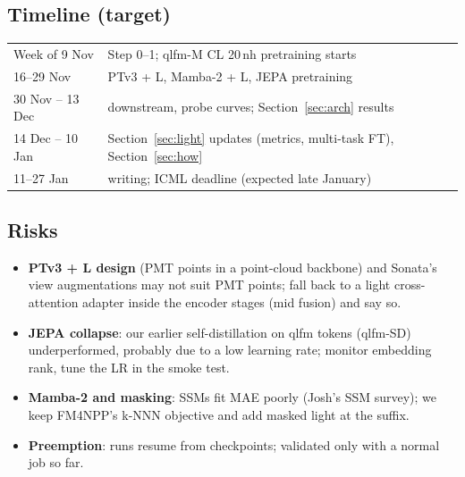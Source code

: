 \documentclass[11pt,a4paper]{article}
\begin{document}
\subsection{Timeline (target)}
\begin{tabular}{ll}
Week of 9 Nov & Step 0--1; qlfm-M CL 20\,nh pretraining starts\\
16--29 Nov & PTv3 + L, Mamba-2 + L, JEPA pretraining\\
30 Nov -- 13 Dec & downstream, probe curves; Section~\ref{sec:arch} results\\
14 Dec -- 10 Jan & Section~\ref{sec:light} updates (metrics, multi-task FT), Section~\ref{sec:how}\\
11--27 Jan & writing; ICML deadline (expected late January)\\
\end{tabular}

\subsection{Risks}
\begin{itemize}
  \item \textbf{PTv3 + L design} (PMT points in a point-cloud backbone) and Sonata's view augmentations may not suit PMT points; fall back to a light cross-attention adapter inside the encoder stages (mid fusion) and say so.
  \item \textbf{JEPA collapse}: our earlier self-distillation on qlfm tokens (qlfm-SD) underperformed, probably due to a low learning rate; monitor embedding rank, tune the LR in the smoke test.
  \item \textbf{Mamba-2 and masking}: SSMs fit MAE poorly (Josh's SSM survey); we keep FM4NPP's k-NNN objective and add masked light at the suffix.
  \item \textbf{Preemption}: runs resume from checkpoints; validated only with a normal job so far.
\end{itemize}
\end{document}
